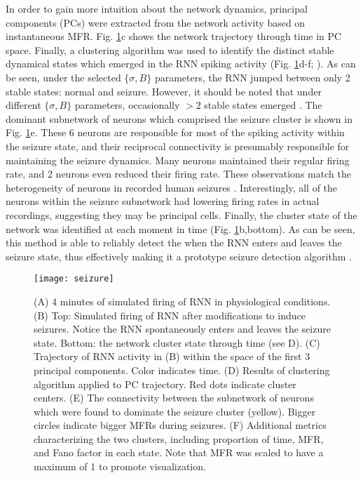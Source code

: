 \documentclass[11pt,a4paper,final]{article}
\begin{document}
In order to gain more intuition about the network dynamics, principal components (PCs) were extracted from the network activity based on instantaneous MFR.
Fig. \ref{seizure}c shows the network trajectory through time in PC space.
Finally, a clustering algorithm was used to identify the distinct stable dynamical states which emerged in the RNN spiking activity (Fig. \ref{seizure}d-f; \citet{sasaki07,santaniello14}).
As can be seen, under the selected $\{\sigma,B\}$ parameters, the RNN jumped between only 2 stable states: normal and seizure.
However, it should be noted that under different $\{\sigma,B\}$ parameters, occasionally $>2$ stable states emerged \citep{mazzucato15}.	
The dominant subnetwork of neurons which comprised the seizure cluster is shown in Fig. \ref{seizure}e.
These 6 neurons are responsible for most of the spiking activity within the seizure state, and their reciprocal connectivity is presumably responsible for maintaining the seizure dynamics.
Many neurons maintained their regular firing rate, and 2 neurons even reduced their firing rate.
These observations match the heterogeneity of neurons in recorded human seizures \citep{bower12}.
Interestingly, all of the neurons within the seizure subnetwork had lowering firing rates in actual recordings, suggesting they may be principal cells.
Finally, the cluster state of the network was identified at each moment in time (Fig. \ref{seizure}b,bottom).
As can be seen, this method is able to reliably detect the when the RNN enters and leaves the seizure state, thus effectively making it a prototype seizure detection algorithm \citep{mormann07,cook13,netoff15}.

\begin{figure}[!ht]
\centering
\texttt{[image: seizure]}
\caption[Seizure Induction]{
	(A) 4 minutes of simulated firing of RNN in physiological conditions.
	(B) Top: Simulated firing of RNN after modifications to induce seizures. Notice the RNN spontaneously enters and leaves the seizure state.
	    Bottom: the network cluster state through time (see D).
	(C) Trajectory of RNN activity in (B) within the space of the first 3 principal components. Color indicates time.
	(D) Results of clustering algorithm applied to PC trajectory. Red dots indicate cluster centers.
	(E) The connectivity between the subnetwork of neurons which were found to dominate the seizure cluster (yellow). Bigger circles indicate bigger MFRs during seizures.
	(F) Additional metrics characterizing the two clusters, including proportion of time, MFR, and Fano factor in each state. Note that MFR was scaled to have a maximum of 1 to promote visualization.
}
\label{seizure}
\end{figure}
\end{document}
